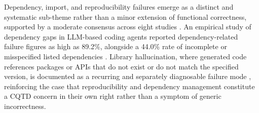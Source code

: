 Dependency, import, and reproducibility failures emerge as a distinct and systematic sub-theme rather than a minor extension of functional correctness, supported by a moderate consensus across eight studies \cite{vangala_ai-generated_2026,twist_library_2025,latendresse_how_2025,zheng_top_2025,chen_evaluating_2024,tian_codehalu_2025,liu_debt_2026}. An empirical study of dependency gaps in LLM-based coding agents reported dependency-related failure figures as high as 89.2\%, alongside a 44.0\% rate of incomplete or misspecified listed dependencies \cite{vangala_ai-generated_2026}. Library hallucination, where generated code references packages or APIs that do not exist or do not match the specified version, is documented as a recurring and separately diagnosable failure mode \cite{twist_library_2025,latendresse_how_2025}, reinforcing the case that reproducibility and dependency management constitute a CQTD concern in their own right rather than a symptom of generic incorrectness.

